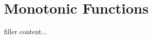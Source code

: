 \documentclass[../../templates/section]{subfiles}
\begin{document}
\section{Monotonic Functions}\label{sec:monotonic-functions}

filler content...
\end{document}

